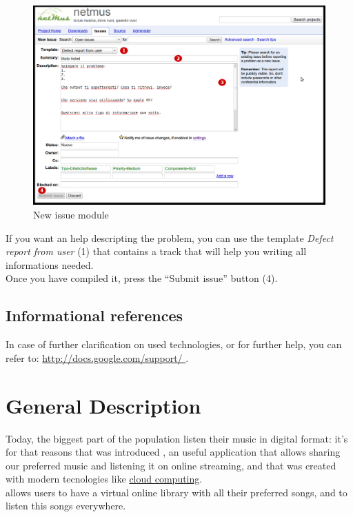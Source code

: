 \begin{figure}[!htbp]
  \centering
  \includegraphics[width=16cm]{img/MU/new_issue.png}
\caption{New issue module}
\label{fig:newIssue}
\end{figure}

If you want an help descripting the problem, you can use the template
\emph{Defect report from user} (1) that contains a track that will help you writing all 
informations needed.\\

Once you have compiled it, press the ``Submit issue'' button (4).

\section{Informational references}
In case of further clarification on used technologies, or for further
help, you can refer to: \url{http://docs.google.com/support/
} .

\chapter{General Description}
\thispagestyle{fancy}
Today, the biggest part of the population listen their music in digital
format: it's for that reasons that was introduced , an useful
application that allows sharing our preferred music and listening it on online
streaming, and that was created with modern tecnologies like \underline{cloud
computing}.\\

 allows users to have a virtual online library with all their
preferred songs, and to listen this songs everywhere.\\

